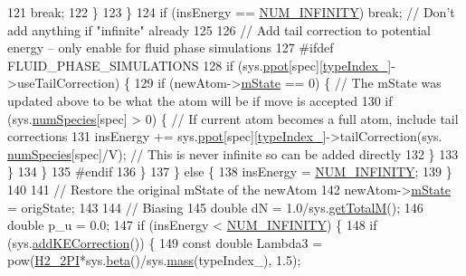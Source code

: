\begin{DoxyCode}
121                     \textcolor{keywordflow}{break};
122                 \}
123             \}
124             \textcolor{keywordflow}{if} (insEnergy == \hyperlink{potentials_8h_ab94ab1d09e2291d03fe92a0e24a9d33b}{NUM\_INFINITY}) \textcolor{keywordflow}{break}; \textcolor{comment}{// Don't add anything if "infinite" already}
125 
126             \textcolor{comment}{// Add tail correction to potential energy -- only enable for fluid phase simulations}
127 \textcolor{preprocessor}{    #ifdef FLUID\_PHASE\_SIMULATIONS}
128 \textcolor{preprocessor}{}            \textcolor{keywordflow}{if} (sys.\hyperlink{classsim_system_ad2e290b5963f132e6a3a56cee35c8e9f}{ppot}[spec][\hyperlink{classmc_move_acb731965547b0326ef318ec96da8b46a}{typeIndex\_}]->useTailCorrection) \{
129                 \textcolor{keywordflow}{if} (newAtom->\hyperlink{classatom_a3cb00c0c5b7533657e05af6ff4a42740}{mState} == 0) \{ \textcolor{comment}{// The mState was updated above to be what the atom will
       be if move is accepted}
130                     \textcolor{keywordflow}{if} (sys.\hyperlink{classsim_system_a9eea865e6dc1cff377b1e79c4d9c23f0}{numSpecies}[spec] > 0) \{ \textcolor{comment}{// If current atom becomes a full atom,
       include tail corrections}
131                         insEnergy += sys.\hyperlink{classsim_system_ad2e290b5963f132e6a3a56cee35c8e9f}{ppot}[spec][\hyperlink{classmc_move_acb731965547b0326ef318ec96da8b46a}{typeIndex\_}]->tailCorrection(sys.
      \hyperlink{classsim_system_a9eea865e6dc1cff377b1e79c4d9c23f0}{numSpecies}[spec]/V); \textcolor{comment}{// This is never infinite so can be added directly}
132                     \}
133                 \}
134             \}
135 \textcolor{preprocessor}{    #endif}
136 \textcolor{preprocessor}{}        \}
137     \} \textcolor{keywordflow}{else} \{
138         insEnergy = \hyperlink{potentials_8h_ab94ab1d09e2291d03fe92a0e24a9d33b}{NUM\_INFINITY};
139     \}
140 
141     \textcolor{comment}{// Restore the original mState of the newAtom}
142     newAtom->\hyperlink{classatom_a3cb00c0c5b7533657e05af6ff4a42740}{mState} = origState;
143 
144     \textcolor{comment}{// Biasing}
145     \textcolor{keywordtype}{double} dN = 1.0/sys.\hyperlink{classsim_system_aa4ad1afff101bb530e1590df05035276}{getTotalM}();
146     \textcolor{keywordtype}{double} p\_u = 0.0;
147     \textcolor{keywordflow}{if} (insEnergy < \hyperlink{potentials_8h_ab94ab1d09e2291d03fe92a0e24a9d33b}{NUM\_INFINITY}) \{
148         \textcolor{keywordflow}{if} (sys.\hyperlink{classsim_system_a09c4ea670168c9f1d549d2a5120eb13c}{addKECorrection}()) \{
149             \textcolor{keyword}{const} \textcolor{keywordtype}{double} Lambda3 = pow(\hyperlink{global_8h_af42f520b793f7c9dff15cba3bad0eb58}{H2\_2PI}*sys.\hyperlink{classsim_system_a3eeec9678902f8d7fce4dad6064aaf4c}{beta}()/sys.\hyperlink{classsim_system_a7c75052458072e1267bc20594b58d8cd}{mass}(typeIndex\_), 1.5);

\end{DoxyCode}
